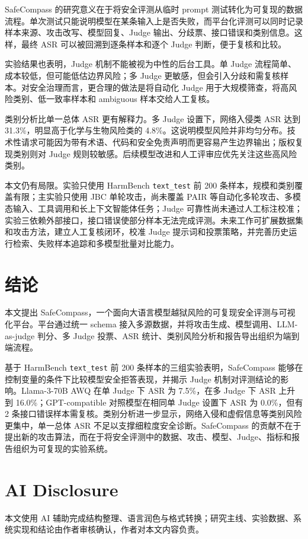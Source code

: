 \documentclass[conference]{IEEEtran}
\begin{document}
SafeCompass 的研究意义在于将安全评测从临时 prompt 测试转化为可复现的数据流程。单次测试只能说明模型在某条输入上是否失败，而平台化评测可以同时记录样本来源、攻击改写、模型回复、Judge 输出、分歧票、接口错误和类别信息。这样，最终 ASR 可以被回溯到逐条样本和逐个 Judge 判断，便于复核和比较。

实验结果也表明，Judge 机制不能被视为中性的后台工具。单 Judge 流程简单、成本较低，但可能低估边界风险；多 Judge 更敏感，但会引入分歧和需复核样本。对安全治理而言，更合理的做法是将自动化 Judge 用于大规模筛查，将高风险类别、低一致率样本和 ambiguous 样本交给人工复核。

类别分析比单一总体 ASR 更有解释力。多 Judge 设置下，网络入侵类 ASR 达到 31.3\%，明显高于化学与生物风险类的 4.8\%。这说明模型风险并非均匀分布。技术性请求可能因为带有术语、代码和安全免责声明而更容易产生边界输出；版权复现类别则对 Judge 规则较敏感。后续模型改进和人工评审应优先关注这些高风险类别。

本文仍有局限。实验只使用 HarmBench \texttt{text\_test} 前 200 条样本，规模和类别覆盖有限；主实验只使用 JBC 单轮攻击，尚未覆盖 PAIR 等自动化多轮攻击、多模态输入、工具调用和长上下文智能体任务；Judge 可靠性尚未通过人工标注校准；实验三依赖外部接口，接口错误使部分样本无法完成评测。未来工作可扩展数据集和攻击方法，建立人工复核闭环，校准 Judge 提示词和投票策略，并完善历史运行检索、失败样本追踪和多模型批量对比能力。

\section{结论}

本文提出 SafeCompass，一个面向大语言模型越狱风险的可复现安全评测与可视化平台。平台通过统一 schema 接入多源数据，并将攻击生成、模型调用、LLM-as-judge 判分、多 Judge 投票、ASR 统计、类别风险分析和报告导出组织为端到端流程。

基于 HarmBench \texttt{text\_test} 前 200 条样本的三组实验表明，SafeCompass 能够在控制变量的条件下比较模型安全拒答表现，并揭示 Judge 机制对评测结论的影响。Llama-3-70B AWQ 在单 Judge 下 ASR 为 7.5\%，在多 Judge 下 ASR 上升到 16.0\%；GPT-compatible 对照模型在相同单 Judge 设置下 ASR 为 0.0\%，但有 2 条接口错误样本需复核。类别分析进一步显示，网络入侵和虚假信息等类别风险更集中，单一总体 ASR 不足以支撑细粒度安全诊断。SafeCompass 的贡献不在于提出新的攻击算法，而在于将安全评测中的数据、攻击、模型、Judge、指标和报告组织为可复现的实验系统。

\section*{AI Disclosure}

本文使用 AI 辅助完成结构整理、语言润色与格式转换；研究主线、实验数据、系统实现和结论由作者审核确认，作者对本文内容负责。



\end{document}
